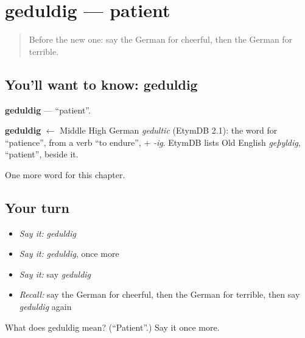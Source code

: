 \section[geduldig]{geduldig — patient}

\label{lesson:GE-C214-geduldig}



\begin{quote}
Before the new one: say the German for cheerful, then the German for terrible.
\end{quote}

\subsection*{You'll want to know: geduldig}
\textbf{geduldig} — \textquotedblleft{}patient\textquotedblright{}.

\begin{cousinweb}
\textbf{geduldig} $\leftarrow$ Middle High German \emph{gedultic} (EtymDB 2.1): the word for \textquotedblleft{}patience\textquotedblright{}, from a verb \textquotedblleft{}to endure\textquotedblright{}, + \emph{-ig}. EtymDB lists Old English \emph{geþyldig}, \textquotedblleft{}patient\textquotedblright{}, beside it.
\end{cousinweb}

\begin{grammarlens}[title={What you've built}]
One more word for this chapter.
\end{grammarlens}

\subsection*{Your turn}
\begin{itemize}
\raggedright
  \item \emph{Say it:} \emph{geduldig}
  \item \emph{Say it:} \emph{geduldig}, once more
  \item \emph{Say it:} say \emph{geduldig}
  \item \emph{Recall:} say the German for cheerful, then the German for terrible, then say \emph{geduldig} again
\end{itemize}

\begin{tcolorbox}[breakable,colback=teal!4,colframe=teal!35!black,title={Before you move on}]
What does geduldig mean? (\textquotedblleft{}Patient\textquotedblright{}.) Say it once more.
\end{tcolorbox}
